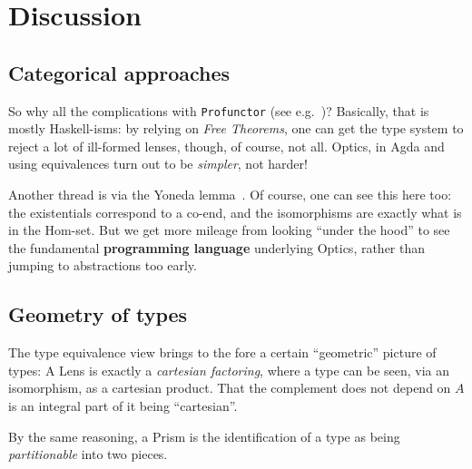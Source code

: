 \documentclass[sigplan,review,anonymous]{acmart}\settopmatter{printfolios=true,printccs=false,printacmref=false}
\begin{document}
\section{Discussion}

\subsection{Categorical approaches}

So why all the complications with \texttt{Profunctor} (see
e.g.~\cite{achromatic})? Basically, that is mostly Haskell-isms: by
relying on \emph{Free Theorems}, one can get the type system to reject
a lot of ill-formed lenses, though, of course, not all. Optics, in
Agda and using equivalences turn out to be \emph{simpler}, not harder!

Another thread is via the Yoneda
lemma~\cite{Boisseau:2018:YNK:3243631.3236779}. Of course, one can see
this here too: the existentials correspond to a co-end, and the
isomorphisms are exactly what is in the Hom-set. But we get more
mileage from looking ``under the hood'' to see the fundamental
\textbf{programming language} underlying Optics, rather than jumping
to abstractions too early.

\begin{comment}
\subsection{Laws}

Why do lenses have 3 laws but equivalences have two?  Because the functions that
make up lenses have 3 laws --- the products have $\eta$. And the proof of putput uses it.
Why do prisms have 2 laws then? This remains unclear.

Why do some bidirectional programming eschew the putput law? In part, this seems due
to
\end{comment}

\subsection{Geometry of types}

The type equivalence view brings to the fore a certain ``geometric''
picture of types: A Lens is exactly a \emph{cartesian factoring},
where a type can be seen, via an isomorphism, as a cartesian product.
That the complement does not depend on $A$ is an integral part of
it being ``cartesian''.

By the same reasoning, a Prism is the identification of a type as
being \emph{partitionable} into two pieces.
\end{document}
